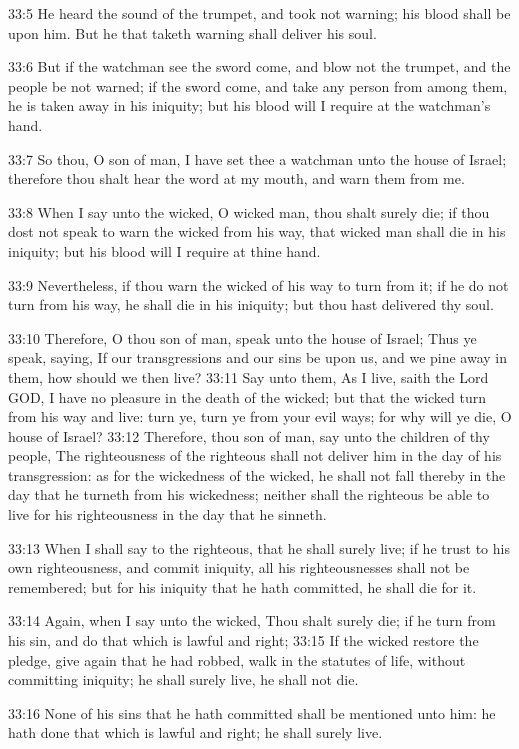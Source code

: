 33:5 He heard the sound of the trumpet, and took not warning; his
blood shall be upon him. But he that taketh warning shall deliver his
soul.

33:6 But if the watchman see the sword come, and blow not the trumpet,
and the people be not warned; if the sword come, and take any person
from among them, he is taken away in his iniquity; but his blood will
I require at the watchman's hand.

33:7 So thou, O son of man, I have set thee a watchman unto the house
of Israel; therefore thou shalt hear the word at my mouth, and warn
them from me.

33:8 When I say unto the wicked, O wicked man, thou shalt surely die;
if thou dost not speak to warn the wicked from his way, that wicked
man shall die in his iniquity; but his blood will I require at thine
hand.

33:9 Nevertheless, if thou warn the wicked of his way to turn from it;
if he do not turn from his way, he shall die in his iniquity; but thou
hast delivered thy soul.

33:10 Therefore, O thou son of man, speak unto the house of Israel;
Thus ye speak, saying, If our transgressions and our sins be upon us,
and we pine away in them, how should we then live?  33:11 Say unto
them, As I live, saith the Lord GOD, I have no pleasure in the death
of the wicked; but that the wicked turn from his way and live: turn
ye, turn ye from your evil ways; for why will ye die, O house of
Israel?  33:12 Therefore, thou son of man, say unto the children of
thy people, The righteousness of the righteous shall not deliver him
in the day of his transgression: as for the wickedness of the wicked,
he shall not fall thereby in the day that he turneth from his
wickedness; neither shall the righteous be able to live for his
righteousness in the day that he sinneth.

33:13 When I shall say to the righteous, that he shall surely live; if
he trust to his own righteousness, and commit iniquity, all his
righteousnesses shall not be remembered; but for his iniquity that he
hath committed, he shall die for it.

33:14 Again, when I say unto the wicked, Thou shalt surely die; if he
turn from his sin, and do that which is lawful and right; 33:15 If the
wicked restore the pledge, give again that he had robbed, walk in the
statutes of life, without committing iniquity; he shall surely live,
he shall not die.

33:16 None of his sins that he hath committed shall be mentioned unto
him: he hath done that which is lawful and right; he shall surely
live.

